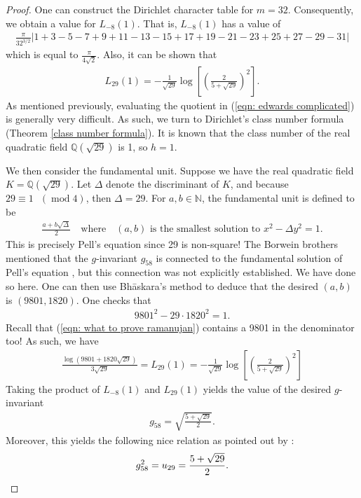 \documentclass[11pt]{amsart}
\theoremstyle{definition}
\numberwithin{theorem}{section}
\begin{document}
\begin{proof}
One can construct the Dirichlet character table for $m=32$. Consequently, we obtain a value for $L_{-8}\left(1\right)$. That is, $L_{-8}\left(1\right)$ has a value of
\begin{align*}
    \frac{\pi}{32^{3/2}}\left|1+3-5-7+9+11-13-15+17+19-21-23+25+27-29-31\right|
\end{align*}
which is equal to $\frac{\pi}{4\sqrt{2}}$. Also, it can be shown that \begin{align*}
    L_{29}\left(1\right)=-\frac{1}{\sqrt{29}}\operatorname{log}\left[\left(\frac{2}{5+\sqrt{29}}\right)^2\right].
\end{align*}
As mentioned previously, evaluating the quotient in (\ref{eqn: edwards complicated}) is generally very difficult. As such, we turn to Dirichlet's class number formula (Theorem \ref{class number formula}). It is known that the class number of the real quadratic field $\mathbb{Q}\left(\sqrt{29}\right)$ is 1, so $h=1$. 

We then consider the fundamental unit. Suppose we have the real quadratic field $K=\mathbb{Q}\left(\sqrt{29}\right)$. Let $\Delta$ denote the discriminant of $K$, and because $29\equiv 1\text{ }\left(\operatorname{mod}4\right)$, then $\Delta=29$. For $a,b\in\mathbb{N}$, the fundamental unit is defined to be \begin{align*}
    \frac{a+b\sqrt{\Delta}}{2}\quad\text{where}\quad \left(a,b\right)\text{ is the smallest solution to }x^2-\Delta y^2=1.
\end{align*}
This is precisely Pell's equation since 29 is non-square! The Borwein brothers mentioned that the $g$-invariant $g_{58}$ is connected to the fundamental solution of Pell's equation \cite{borwein pi proof 1987}, but this connection was not explicitly established. We have done so here. One can then use Bhāskara's method to deduce that the desired $\left(a,b\right)$ is $\left(9801,1820\right)$. One checks that \begin{align*}
    9801^2-29\cdot 1820^2=1.
\end{align*}
Recall that (\ref{eqn: what to prove ramanujan}) contains a 9801 in the denominator too! As such, we have \begin{align*}
    \frac{\operatorname{log}\left(9801+1820\sqrt{29}\right)}{3\sqrt{29}}=L_{29}\left(1\right)=-\frac{1}{\sqrt{29}}\operatorname{log}\left[\left(\frac{2}{5+\sqrt{29}}\right)^2\right]
\end{align*}
Taking the product of $L_{-8}\left(1\right)$ and $L_{29}\left(1\right)$ yields the value of the desired $g$-invariant \begin{align*}
    g_{58}=\sqrt{\frac{5+\sqrt{29}}{2}}.
\end{align*}
Moreover, this yields the following nice relation as pointed out by \cite{borwein pi proof 1987,wong}: \[g_{58}^2=u_{29}=\frac{5+\sqrt{29}}{2}. \qedhere\]
\end{proof}
\end{document}
